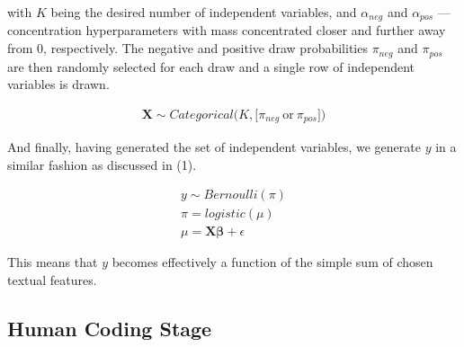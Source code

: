 \documentclass[man, 12pt, a4paper, nolmodern, noextraspace]{apa6}
\begin{document}
    \noindent with $K$ being the desired number of independent variables, and $\alpha_{neg}$ and $\alpha_{pos}$ --- concentration hyperparameters with mass concentrated closer and further away from 0, respectively. The negative and positive draw probabilities $\pi_{neg}$ and $\pi_{pos}$ are then randomly selected for each draw and a single row of independent variables is drawn. 
    
    \begin{equation}
        \begin{gathered}
            \boldsymbol{X} \sim Categorical\bigl(K, \bigl[\pi_{neg}\ \textrm{or}\ \pi_{pos}\bigr]\bigr)
        \end{gathered}
    \end{equation}
    
    And finally, having generated the set of independent variables, we generate $y$ in a similar fashion as discussed in (1).
    
     \begin{equation}
        \begin{gathered}
            y \sim Bernoulli(\pi) \\
            \pi = logistic(\mu) \\
            \mu = \boldsymbol{X\beta} + \epsilon
        \end{gathered}
    \end{equation}   
    
This means that $y$ becomes effectively a function of the simple sum of chosen textual features. 

    \subsection{Human Coding Stage}
    
\end{document}

